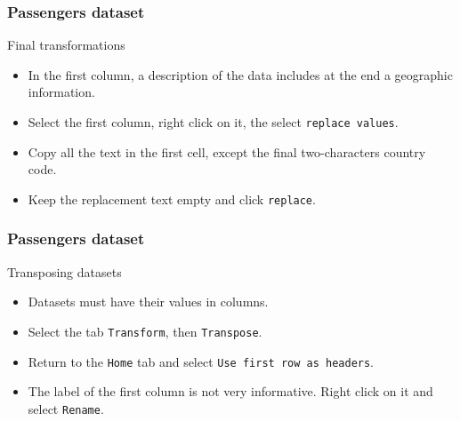\begin{frame}
    \frametitle{Passengers dataset}
    \begin{block}{Final transformations}
        \begin{itemize}
            \item<+-> In the first column, a description of the data includes at the end a geographic information. 
            \item<+-> Select the first column, right click on it, the select \texttt{replace values}.
            \item<+-> Copy all the text in the first cell, except the final two-characters country code.
            \item<+-> Keep the replacement text empty and click \texttt{replace}. 
        \end{itemize}
    \end{block}
   
    
\end{frame}
\begin{frame}
    \frametitle{Passengers dataset}
    \begin{block}{Transposing datasets}
        \begin{itemize}
            \item<+-> Datasets must have their values in columns.
            \item<+-> Select the tab \texttt{Transform}, then \texttt{Transpose}.
            \item<+-> Return to the \texttt{Home} tab and select \texttt{Use first row as headers}.
            \item<+-> The label of the first column is not very informative. Right click 
            on it and select \texttt{Rename}.
        \end{itemize}
    \end{block}

\end{frame}
